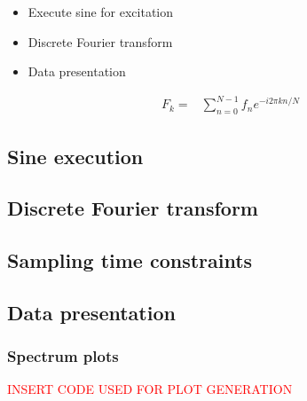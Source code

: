 \begin{itemize}
	\item Execute sine for excitation
	\item Discrete Fourier transform
	\item Data presentation
\end{itemize}

\begin{align}
	F_k = & \sum_{n=0}^{N-1} f_n e^{-i 2 \pi k n / N}
\end{align}

\subsection{Sine execution}
\subsection{Discrete Fourier transform}
\subsection{Sampling time constraints}
\subsection{Data presentation}
\subsubsection{Spectrum plots}

\textcolor{red}{INSERT CODE USED FOR PLOT GENERATION}
\lstset{style=python}
\begin{lstlisting}[language=python]
\end{lstlisting}


